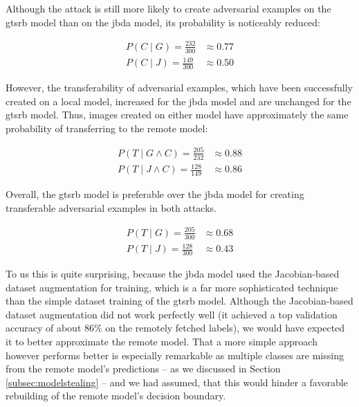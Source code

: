 Although the attack is still more likely to create adversarial examples on the gtsrb model than on the jbda model, its probability is noticeably reduced:

\begin{align*}
P(C \mid G) = \frac{232}{300} &\approx 0.77\\[1ex]
P(C \mid J) = \frac{149}{300} &\approx 0.50
\end{align*}

However, the transferability of adversarial examples, which have been successfully created on a local model, increased for the jbda model and are unchanged for the gtsrb model. Thus, images created on either model have approximately the same probability of transferring to the remote model:

\begin{align*}
P(T \mid G \wedge C) = \frac{205}{232} &\approx 0.88\\[1ex]
P(T \mid J \wedge C) = \frac{128}{149} &\approx 0.86
\end{align*}

Overall, the gtsrb model is preferable over the jbda model for creating transferable adversarial examples in both attacks. 

\begin{align*}
P(T \mid G) = \frac{205}{300} &\approx 0.68\\[1ex]
P(T \mid J) = \frac{128}{300} &\approx 0.43
\end{align*}

To us this is quite surprising, because the jbda model used the Jacobian-based dataset augmentation for training, which is a far more sophisticated technique than the simple dataset training of the gtsrb model. 
Although the Jacobian-based dataset augmentation did not work perfectly well (it achieved a top validation accuracy of about 86\% on the remotely fetched labels), we would have expected it to better approximate the remote model.
That a more simple approach however performs better is especially remarkable as multiple classes are missing from the remote model's predictions -- as we discussed in Section \ref{subsec:modelstealing} -- and we had assumed, that this would hinder a favorable rebuilding of the remote model's decision boundary.